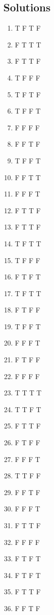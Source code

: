 \documentclass[10pt,a4paper]{article}
\begin{document}
\subsection{Solutions}
\begin{enumerate}[label=\textbf{\arabic*})]
\item T F T F
\item F T T T
\item F T T F
\item T F F F
\item T F T F
\item T F F T
\item F F F F
\item F F T F
\item T F F T
\item F F T T
\item F F F T
\item F T T F
\item F T T F
\item T F T T
\item T F F F
\item F T F T
\item T F T T
\item F T F F
\item T F F T
\item F F F T
\item F T F F
\item F F F F
\item T T T T
\item T T F T
\item F T T F
\item F T F F
\item F F F T
\item T T F F
\item F F T F
\item F F F T
\item F T T F
\item F F F F
\item F T F T
\item F T F T
\item F T T F
\item F F T F
\end{enumerate}
\end{document}
